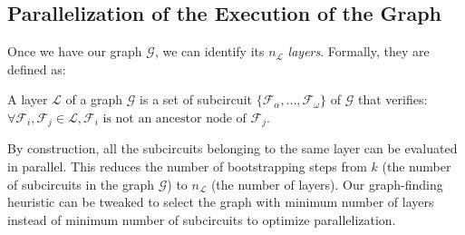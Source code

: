 \subsection{Parallelization of the Execution of the Graph}
\label{sec:parallelization}

Once we have our graph $\mathcal{G}$, we can identify its $n_\mathcal{L}$ \emph{layers}. Formally, they are defined as:

\begin{definition}
    A layer $\mathcal{L}$ of a graph $\mathcal{G}$ is a set of subcircuit $\{\mathcal {F}_\alpha, \dots, \mathcal{F}_\omega\}$ of $\mathcal{G}$ that verifies: $\forall \mathcal{F}_i, \mathcal{F}_j \in \mathcal{L}, \mathcal{F}_i \text{ is not an ancestor node of } \mathcal{F}_j.$    
\end{definition}

By construction, all the subcircuits belonging to the same layer can be evaluated in parallel. This reduces the number of bootstrapping steps from $k$ (the number of subcircuits in the graph $\mathcal{G}$) to $n_\mathcal{L}$ (the number of layers). Our graph-finding heuristic can be tweaked to select the graph with minimum number of layers instead of minimum number of subcircuits to optimize parallelization.
